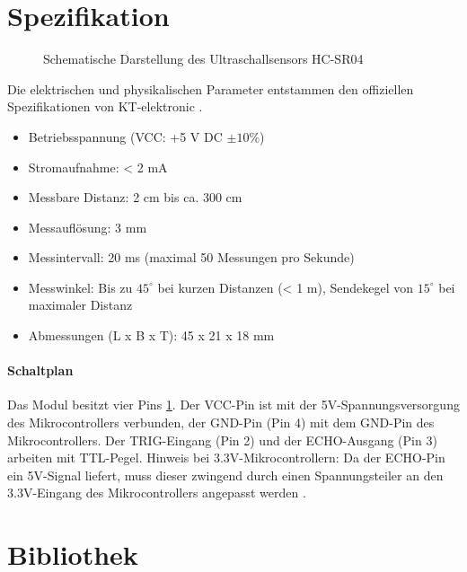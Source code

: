 \section{Spezifikation}


\begin{figure}[htbp]
	\centering
	
	\caption{Schematische Darstellung des Ultraschallsensors HC-SR04}
	\label{fig:hcsr04_tikz}
\end{figure}

	Die elektrischen und physikalischen Parameter entstammen den offiziellen Spezifikationen von KT-elektronic \cite{KT:2012}.
	\begin{itemize}
		\item Betriebsspannung (VCC: +5 V DC $\pm 10\%$)
		\item Stromaufnahme: < 2 mA
		\item Messbare Distanz: 2 cm bis ca. 300 cm 
		\item Messauflösung: 3 mm
		\item Messintervall: 20 ms (maximal 50 Messungen pro Sekunde)
		\item Messwinkel: Bis zu $45^\circ$ bei kurzen Distanzen (< 1 m), Sendekegel von $15^\circ$ bei maximaler Distanz
		\item Abmessungen (L x B x T): 45 x 21 x 18 mm
	\end{itemize}



\paragraph{Schaltplan}
Das Modul besitzt vier Pins \ref{fig:hcsr04_tikz}. Der VCC-Pin ist mit der 5V-Spannungsversorgung des Mikrocontrollers verbunden, der GND-Pin (Pin 4) mit dem GND-Pin des Mikrocontrollers. Der TRIG-Eingang (Pin 2) und der ECHO-Ausgang (Pin 3) arbeiten mit TTL-Pegel. 
Hinweis bei 3.3V-Mikrocontrollern: Da der ECHO-Pin ein 5V-Signal liefert, muss dieser zwingend durch einen Spannungsteiler an den 3.3V-Eingang des Mikrocontrollers angepasst werden \cite{KT:2012}.

\section{Bibliothek}

